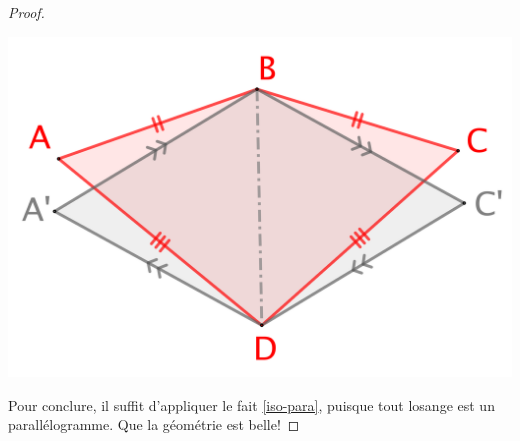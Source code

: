 \begin{proof}
	\begin{center}
		\includegraphics[scale=.4]{content/quadrilateral/convex-isopaire.png}
	\end{center}
	
	
	Pour conclure, il suffit d'appliquer le fait \ref{iso-para}, puisque tout losange est un parallélogramme. Que la géométrie est belle!
\end{proof}
